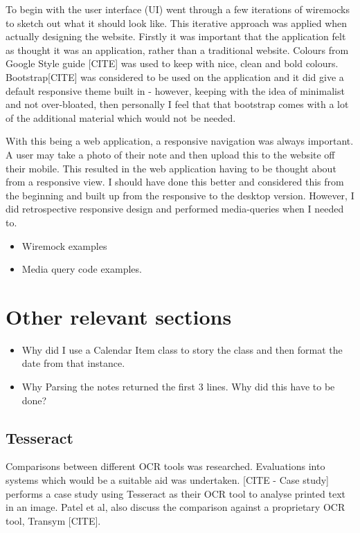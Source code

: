 To begin with the user interface (UI) went through a few iterations of wiremocks to sketch out what it should look like.  This iterative approach was applied when actually designing the website. Firstly it was important that the application felt as thought it was an application, rather than a traditional website. Colours from Google Style guide [CITE] was used to keep with nice, clean and bold colours. Bootstrap[CITE] was considered to be used on the application and it did give a default responsive theme built in - however, keeping with the idea of minimalist and not over-bloated, then personally I feel that that bootstrap comes with a lot of the additional material which would not be needed.

With this being a web application, a responsive navigation was always important. A user may take a photo of their note and then upload this to the website off their mobile. This resulted in the web application having to be thought about from a responsive view. I should have done this better and considered this from the beginning and built up from the responsive to the desktop version. However, I did retrospective responsive design and performed media-queries when I needed to.
\begin{itemize}
  \item Wiremock examples
  \item Media query code examples.
\end{itemize}
\section{Other relevant sections}
\begin{itemize}
  \item Why did I use a Calendar Item class to story the class and then format the date from that instance.
  \item Why Parsing the notes returned the first 3 lines. Why did this have to be done?

\end{itemize}

\subsection{Tesseract}
Comparisons between different OCR tools was researched. Evaluations into systems which would be a suitable aid was undertaken. [CITE - Case study] performs a case study using Tesseract as their OCR tool to analyse printed text in an image. Patel et al, also discuss the comparison against a proprietary OCR tool, Transym [CITE].

